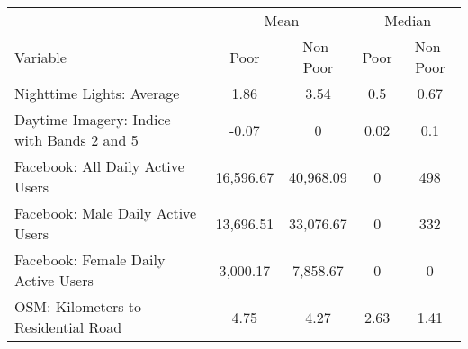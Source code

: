 \begin{tabular}{l|cc|cc} 
\hline 
& \multicolumn{2}{c|}{Mean} & \multicolumn{2}{c}{Median} \\ 
Variable & Poor & Non-Poor & Poor & Non-Poor \\ 
\hline 
Nighttime Lights: Average & 1.86 & 3.54 & 0.5 & 0.67  \\ 
Daytime Imagery: Indice with Bands 2 and 5 & -0.07 & 0 & 0.02 & 0.1  \\ 
Facebook: All Daily Active Users & 16,596.67 & 40,968.09 & 0 & 498  \\ 
Facebook: Male Daily Active Users & 13,696.51 & 33,076.67 & 0 & 332  \\ 
Facebook: Female Daily Active Users & 3,000.17 & 7,858.67 & 0 & 0  \\ 
OSM: Kilometers to Residential Road & 4.75 & 4.27 & 2.63 & 1.41  \\ 
\hline 
\end{tabular} 